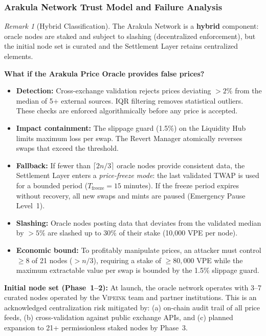 \documentclass[12pt,a4paper]{article}
\theoremstyle{definition}
\theoremstyle{remark}
\newtheorem{remark}{Remark}[section]
\newcommand{\Vipeink}{\textsc{Vipeink}}
\begin{document}
\subsubsection{Arakula Network Trust Model and Failure Analysis}

\begin{remark}[Hybrid Classification]
The Arakula Network is a \textbf{hybrid} component: oracle nodes are staked and subject to slashing (decentralized enforcement), but the initial node set is curated and the Settlement Layer retains centralized elements.
\end{remark}

\textbf{What if the Arakula Price Oracle provides false prices?}

\begin{itemize}[nosep]
    \item \textbf{Detection:} Cross-exchange validation rejects prices deviating $> 2\%$ from the median of 5+ external sources. IQR filtering removes statistical outliers. These checks are enforced algorithmically before any price is accepted.
    \item \textbf{Impact containment:} The slippage guard (1.5\%) on the Liquidity Hub limits maximum loss per swap. The Revert Manager atomically reverses swaps that exceed the threshold.
    \item \textbf{Fallback:} If fewer than $\lceil 2n/3 \rceil$ oracle nodes provide consistent data, the Settlement Layer enters a \emph{price-freeze mode}: the last validated TWAP is used for a bounded period ($T_{\text{freeze}} = 15$ minutes). If the freeze period expires without recovery, all new swaps and mints are paused (Emergency Pause Level~1).
    \item \textbf{Slashing:} Oracle nodes posting data that deviates from the validated median by $> 5\%$ are slashed up to 30\% of their stake (10,000 VPE per node).
    \item \textbf{Economic bound:} To profitably manipulate prices, an attacker must control $\geq 8$ of 21 nodes ($> n/3$), requiring a stake of $\geq 80{,}000$ VPE while the maximum extractable value per swap is bounded by the 1.5\% slippage guard.
\end{itemize}

\textbf{Initial node set (Phase~1--2):} At launch, the oracle network operates with 3--7 curated nodes operated by the \Vipeink{} team and partner institutions. This is an acknowledged centralization risk mitigated by: (a) on-chain audit trail of all price feeds, (b) cross-validation against public exchange APIs, and (c) planned expansion to 21+ permissionless staked nodes by Phase~3.
\end{document}
